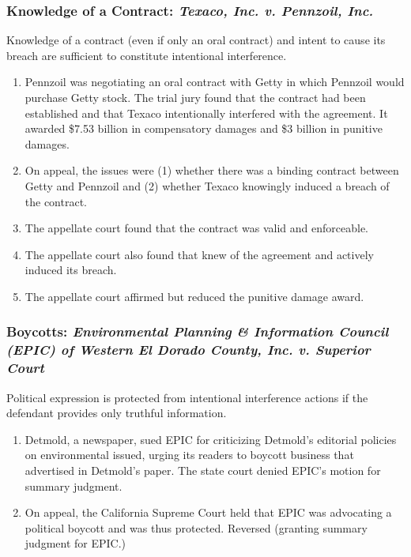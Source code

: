 \subsubsection{Knowledge of a Contract: \emph{Texaco, Inc. v. Pennzoil, Inc.}}

Knowledge of a contract (even if only an oral contract) and intent to cause 
its breach are sufficient to constitute intentional interference.

\begin{enumerate}
    \item Pennzoil was negotiating an oral contract with Getty in which 
    Pennzoil would purchase Getty stock. The trial jury found that the 
    contract had been established and that Texaco intentionally interfered 
    with the agreement. It awarded \$7.53 billion in compensatory damages and 
    \$3 billion in punitive damages.
    \item On appeal, the issues were (1) whether there was a binding contract 
    between Getty and Pennzoil and (2) whether Texaco knowingly induced a 
    breach of the contract.
    \item The appellate court found that the contract was valid and 
    enforceable.
    \item The appellate court also found that knew of the agreement and 
    actively induced its breach.
    \item The appellate court affirmed but reduced the punitive damage award.
\end{enumerate}

\subsubsection{Boycotts: \emph{Environmental Planning \& Information Council 
(EPIC) of Western El Dorado County, Inc. v. Superior Court}}

Political expression is protected from intentional interference actions if the 
defendant provides only truthful information.

\begin{enumerate}
    \item Detmold, a newspaper, sued EPIC for criticizing Detmold's editorial 
    policies on environmental issued, urging its readers to boycott business 
    that advertised in Detmold's paper. The state court denied EPIC's motion 
    for summary judgment.
    \item On appeal, the California Supreme Court held that EPIC was 
    advocating a political boycott and was thus protected. Reversed (granting 
    summary judgment for EPIC.)
\end{enumerate}

